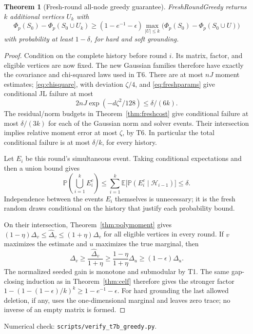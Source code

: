 \documentclass[11pt]{article}
\newtheorem{theorem}{Theorem}
\newcommand{\E}{\mathbb E}
\newcommand{\Prob}{\mathbb P}
\begin{document}
\begin{theorem}[Fresh-round all-node greedy guarantee]\label{thm:freshgreedy}
FreshRoundGreedy returns $k$ additional vertices $U_k$ with
\begin{equation}\label{eq:freshgain}
 \Phi_p(S_0)-\Phi_p(S_0\cup U_k)
 \geq(1-e^{-1}-\epsilon)
   \max_{|U|\leq k}\bigl(\Phi_p(S_0)-\Phi_p(S_0\cup U)\bigr)
\end{equation}
with probability at least $1-\delta$, for hard and soft grounding.
\end{theorem}
\begin{proof}
Condition on the complete history before round $i$. Its matrix,
factor, and eligible vertices are now fixed. The new Gaussian
families therefore have exactly the covariance and chi-squared
laws used in T6. There are at most $nJ$ moment estimates;
\eqref{eq:chisquare}, with deviation $\zeta/4$, and
\eqref{eq:freshparams} give conditional JL failure at most
\[
 2nJ\exp(-d\zeta^2/128)\leq\delta/(6k).
\]
The residual/norm budgets in Theorem~\ref{thm:freshcost} give
conditional failure at most $\delta/(3k)$ for each of the Gaussian
norm and solver events. Their intersection implies relative moment
error at most $\zeta$, by T6. In particular the total conditional
failure is at most $\delta/k$, for every history.

Let $E_i$ be this round's simultaneous event. Taking conditional
expectations and then a union bound gives
\[
 \Prob\left(\bigcup_{i=1}^k E_i^c\right)
 \leq\sum_{i=1}^k\E\bigl[\Prob(E_i^c\mid\mathcal H_{i-1})\bigr]
 \leq\delta.
\]
Independence between the events $E_i$ themselves is unnecessary;
it is the fresh random draws conditional on the history that
justify each probability bound.

On their intersection, Theorem~\ref{thm:polymoment} gives
$(1-\eta)\Delta_v\leq\widehat\Delta_v\leq(1+\eta)\Delta_v$
for all eligible vertices in every round. If $v$ maximizes the
estimate and $u$ maximizes the true marginal, then
\[
 \Delta_v\geq\frac{\widehat\Delta_v}{1+\eta}
 \geq\frac{1-\eta}{1+\eta}\Delta_u
 \geq(1-\epsilon)\Delta_u.
\]
The normalized seeded gain is monotone and submodular by T1.
The same gap-closing induction as in Theorem~\ref{thm:celf}
therefore gives the stronger factor
$1-(1-(1-\epsilon)/k)^k\geq1-e^{-1}-\epsilon$.
For hard grounding the last allowed deletion, if any, uses the
one-dimensional marginal and leaves zero trace; no inverse of
an empty matrix is formed.
\end{proof}
\noindent Numerical check: \texttt{scripts/verify\_t7b\_greedy.py}.
\end{document}
